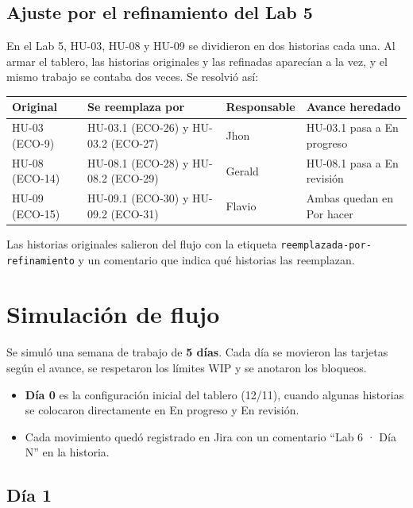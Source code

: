 \documentclass[11pt,a4paper]{article}
\newcommand{\dia}[1]{\subsection*{#1}\addcontentsline{toc}{subsection}{#1}}
\begin{document}
\subsection{Ajuste por el refinamiento del Lab 5}

En el Lab 5, HU-03, HU-08 y HU-09 se dividieron en dos historias cada una. Al armar el tablero, las historias originales y las refinadas aparecían a la vez, y el mismo trabajo se contaba dos veces. Se resolvió así:

\begin{center}
\small
\begin{tabular}{L{2.8cm} L{4.4cm} L{2.2cm} L{4.2cm}}
\toprule
\textbf{Original} & \textbf{Se reemplaza por} & \textbf{Responsable} & \textbf{Avance heredado} \\
\midrule
HU-03 (ECO-9) & HU-03.1 (ECO-26) y HU-03.2 (ECO-27) & Jhon & HU-03.1 pasa a En progreso \\
HU-08 (ECO-14) & HU-08.1 (ECO-28) y HU-08.2 (ECO-29) & Gerald & HU-08.1 pasa a En revisión \\
HU-09 (ECO-15) & HU-09.1 (ECO-30) y HU-09.2 (ECO-31) & Flavio & Ambas quedan en Por hacer \\
\bottomrule
\end{tabular}
\end{center}

Las historias originales salieron del flujo con la etiqueta \texttt{reemplazada-por-refinamiento} y un comentario que indica qué historias las reemplazan.

\section{Simulación de flujo}

Se simuló una semana de trabajo de \textbf{5 días}. Cada día se movieron las tarjetas según el avance, se respetaron los límites WIP y se anotaron los bloqueos.

\begin{itemize}
  \item \textbf{Día 0} es la configuración inicial del tablero (12/11), cuando algunas historias se colocaron directamente en En progreso y En revisión.
  \item Cada movimiento quedó registrado en Jira con un comentario ``Lab 6 · Día N'' en la historia.
\end{itemize}

\dia{Día 1}
\end{document}
